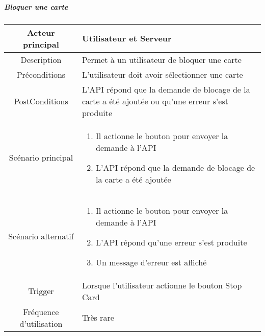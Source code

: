 \documentclass{article}
\begin{document}
\subparagraph{Bloquer une carte}
    \begin{table}[h]
        \begin{tabular}{|c|p{10cm}|}
        \hline
        Acteur principal& Utilisateur et Serveur    \\
        \hline
        Description&  Permet à un utilisateur de bloquer une carte  \\
        \hline
        Préconditions&    L'utilisateur doit avoir sélectionner une carte  \\
        \hline
        PostConditions&  L'API répond que la demande de blocage de la carte a été ajoutée ou qu'une erreur s'est produite    \\
        \hline
        Scénario principal& 
                \begin{enumerate}
                    \item Il actionne le bouton pour envoyer la demande à l'API
                    \item L'API répond que la demande de blocage de la carte a été ajoutée
                \end{enumerate}     \\
        \hline
        Scénario alternatif&  
        \begin{enumerate}
            \item Il actionne le bouton pour envoyer la demande à l'API
            \item L'API répond qu'une erreur s'est produite
            \item Un message d'erreur est affiché
        \end{enumerate}    \\
        \hline
        Trigger&   Lorsque l'utilisateur actionne le bouton Stop Card   \\
        \hline
        Fréquence d'utilisation&    Très rare  \\
        \hline
        \end{tabular}
    \end{table}

\newpage
\end{document}
